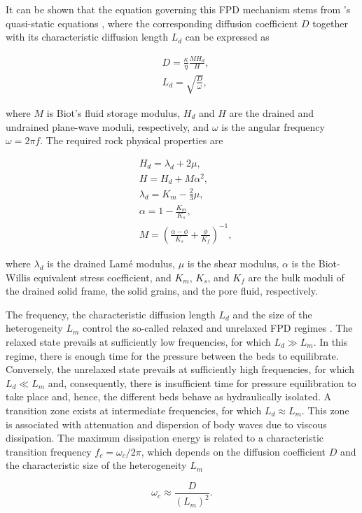 \documentclass[draft]{agujournal2019}
\begin{document}
It can be shown that the equation governing this FPD mechanism stems from \citeauthor{Biot1941}'s \citeyear{Biot1941} quasi-static equations \cite{Dutta1979, Chandler1981, Norris1993}, where the corresponding diffusion coefficient $D$ together with its characteristic diffusion length $L_d$ can be expressed as \cite{Norris1993}
\begin{linenomath*}
\begin{equation}\label{Eq.3}
\begin{split}
&D= \frac {\kappa} {\eta} \frac{M H_d}{H},\\
&L_d=\sqrt{\frac{D}{\omega}},
\end{split}
\end{equation}
\end{linenomath*}
where $M$ is Biot’s fluid storage modulus, $H_d$ and $H$ are the drained and undrained plane-wave moduli, respectively, and $\omega$ is the angular frequency $\omega = 2 \pi f$.
The required rock physical properties are
\begin{linenomath*}
\begin{equation}\label{Eq.4}
\begin{split}
& H_d = \lambda_d + 2 \mu, \\
& H = H_d + M \alpha ^2, \\
& \lambda_d= K_m - \frac{2}{3} \mu, \\
& \alpha =1-\frac{K_m}{K_s},\\
& M  =\left( \frac{\alpha-\phi}{K_s} +\frac{\phi}{K_f} \right)^{-1},
\end{split}
\end{equation}
\end{linenomath*}
where $\lambda_d$ is the drained Lamé modulus, $\mu$ is the shear modulus, $\alpha$ is the Biot-Willis equivalent stress coefficient, and $K_m$, $K_s$, and $K_f$ are the bulk moduli of the drained solid frame, the solid grains, and the pore fluid, respectively.

The frequency, the characteristic diffusion length $L_d$  and the size of the heterogeneity $L_m$ control the so-called relaxed and unrelaxed FPD regimes \cite{Muller2010}. The relaxed state prevails at sufficiently low frequencies, for which  $L_d \gg L_m$. In this regime, there is enough time for the pressure between the beds to equilibrate. Conversely, the unrelaxed state prevails at sufficiently high frequencies, for which $L_d \ll L_m$ and, consequently, there is insufficient time for pressure equilibration to take place and, hence, the different beds behave as hydraulically isolated. A transition zone exists at intermediate frequencies, for which $L_d \approx L_m$.
This zone is associated with attenuation and dispersion of body waves due to viscous dissipation. The maximum dissipation energy is related to a characteristic transition frequency $f_c= \omega_c/2\pi$, which depends on the diffusion coefficient $D$ and the characteristic size of the heterogeneity $L_m$ \cite{Muller2006}
\begin{linenomath*}
\begin{equation}\label{Eq.5}
\omega_c \approx \frac{D}{(L_m)^2}.
\end{equation}
\end{linenomath*}
\end{document}
